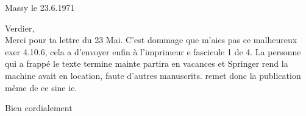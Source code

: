 \begin{flushright}
Massy le 23.6.1971\\
\end{flushright}
 Verdier,\\

Merci pour ta lettre du 23 Mai. C'est dommage que   m'aies pas  ce malheureux exer 4.10.6, cela a  d'envoyer enfin à l'imprimeur e fascicule 1 de  4. La personne qui a frappé le texte termine mainte  partira en vacances et Springer rend la machine  avait en location, faute d'autres manuscrits.  remet donc la publication même de ce  sine ie.

Bien cordialement\\
